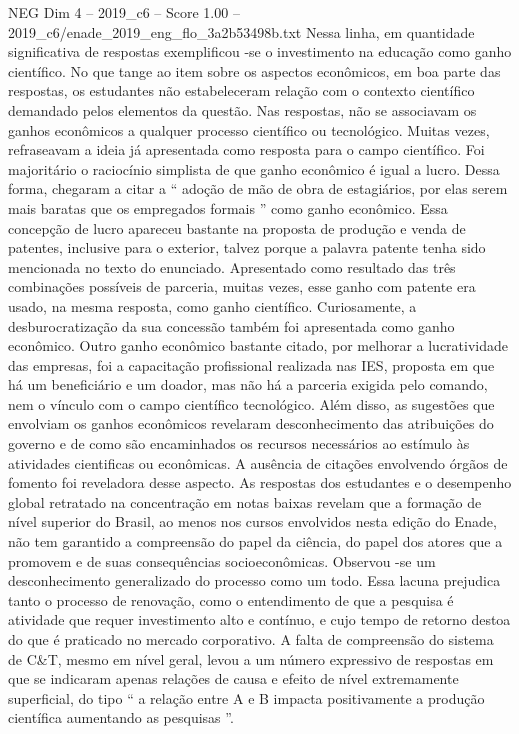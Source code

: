 \begin{textsample}{NEG Dim 4 – 2019\_c6 – Score 1.00 – 2019\_c6/enade\_2019\_eng\_flo\_3a2b53498b.txt}
Nessa linha, em quantidade significativa de respostas exemplificou -se o investimento na educação como ganho científico.
No que tange ao item sobre os aspectos econômicos, em boa parte das respostas, os estudantes não estabeleceram relação com o contexto científico demandado pelos elementos da questão.
Nas respostas, não se associavam os ganhos econômicos a qualquer processo científico ou tecnológico.
Muitas vezes, refraseavam a ideia já apresentada como resposta para o campo científico.
Foi majoritário o raciocínio simplista de que ganho econômico é igual a lucro.
Dessa forma, chegaram a citar a “ adoção de mão de obra de estagiários, por elas serem mais baratas que os empregados formais ” como ganho econômico.
Essa concepção de lucro apareceu bastante na proposta de produção e venda de patentes, inclusive para o exterior, talvez porque a palavra patente tenha sido mencionada no texto do enunciado.
Apresentado como resultado das três combinações possíveis de parceria, muitas vezes, esse ganho com patente era usado, na mesma resposta, como ganho científico.
Curiosamente, a desburocratização da sua concessão também foi apresentada como ganho econômico.
Outro ganho econômico bastante citado, por melhorar a lucratividade das empresas, foi a capacitação profissional realizada nas IES, proposta em que há um beneficiário e um doador, mas não há a parceria exigida pelo comando, nem o vínculo com o campo científico tecnológico.
Além disso, as sugestões que envolviam os ganhos econômicos revelaram desconhecimento das atribuições do governo e de como são encaminhados os recursos necessários ao estímulo às atividades cientificas ou econômicas.
A ausência de citações envolvendo órgãos de fomento foi reveladora desse aspecto.
As respostas dos estudantes e o desempenho global retratado na concentração em notas baixas revelam que a formação de nível superior do Brasil, ao menos nos cursos envolvidos nesta edição do Enade, não tem garantido a compreensão do papel da ciência, do papel dos atores que a promovem e de suas consequências socioeconômicas.
Observou -se um desconhecimento generalizado do processo como um todo.
Essa lacuna prejudica tanto o processo de renovação, como o entendimento de que a pesquisa é atividade que requer investimento alto e contínuo, e cujo tempo de retorno destoa do que é praticado no mercado corporativo.
A falta de compreensão do sistema de C\&T, mesmo em nível geral, levou a um número expressivo de respostas em que se indicaram apenas relações de causa e efeito de nível extremamente superficial, do tipo “ a relação entre A e B impacta positivamente a produção científica aumentando as pesquisas ”.

\end{textsample}
